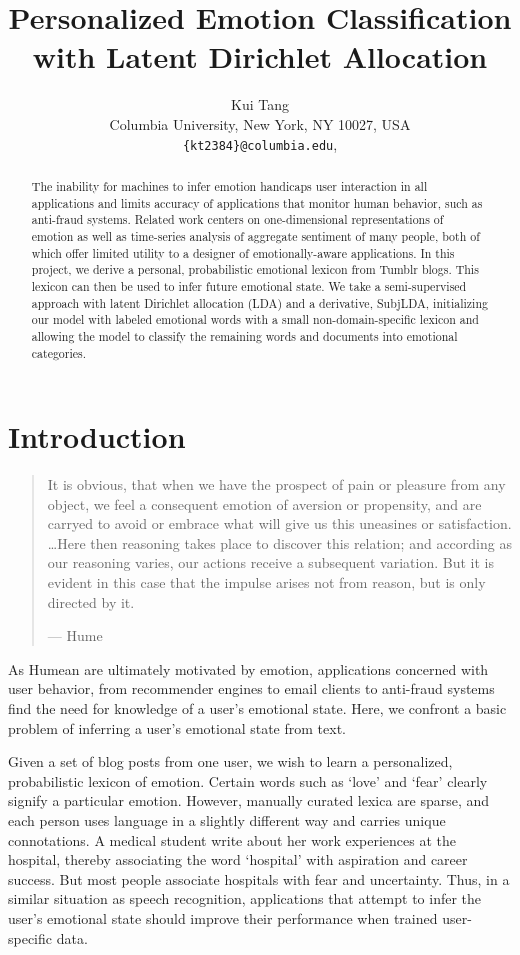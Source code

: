 \documentclass{article}
\title{Personalized Emotion Classification with Latent Dirichlet Allocation}
\author{
Kui Tang\\
Columbia University, New York, NY 10027, USA\\
\texttt{\{kt2384\}@columbia.edu},
}
\begin{document}
\maketitle

\begin{abstract}
The inability for machines to infer emotion handicaps user interaction
in all applications and limits accuracy of applications that monitor
human behavior, such as anti-fraud systems. Related work centers
on one-dimensional representations of emotion as well as time-series
analysis of aggregate sentiment of many people, both of which offer
limited utility to a designer of emotionally-aware applications.
In this project, we derive a personal, probabilistic emotional
lexicon from Tumblr blogs. This lexicon can then be used to infer
future emotional state. We take a semi-supervised approach with
latent Dirichlet allocation (LDA) and a derivative, SubjLDA,
initializing our model with labeled emotional words with a small
non-domain-specific lexicon and allowing the model to classify the
remaining words and documents into emotional categories.
\end{abstract}

\section{Introduction}
\begin{quote}
It is obvious, that when we have the prospect of pain or pleasure
from any object, we feel a consequent emotion of aversion or
propensity, and are carryed to avoid or embrace what will give us
this uneasines or satisfaction. \ldots Here then reasoning takes
place to discover this relation; and according as our reasoning
varies, our actions receive a subsequent variation. But it is evident
in this case that the impulse arises not from reason, but is only
directed by it.

\hspace{9 cm} --- Hume \citep{hume}
\end{quote}
\label{sec:introduction}

As Humean are ultimately motivated by emotion, applications concerned
with user behavior, from recommender engines to email clients to
anti-fraud systems find the need for knowledge of a user's emotional
state. Here, we confront a basic problem of inferring a user's
emotional state from text.

Given a set of blog posts from one user, we wish to learn a
personalized, probabilistic lexicon of emotion. Certain words such
as `love' and `fear' clearly signify a particular emotion.  However,
manually curated lexica are sparse, and each person uses language
in a slightly different way and carries unique connotations. A
medical student write about her work experiences at the hospital,
thereby associating the word `hospital' with aspiration and career
success. But most people associate hospitals with fear and uncertainty.
Thus, in a similar situation as speech recognition, applications
that attempt to infer the user's emotional state should improve
their performance when trained user-specific data.
\end{document}
